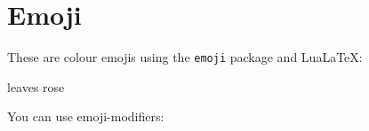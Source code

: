 \documentclass[12pt]{article}
\begin{document}
\section{Emoji }%
\label{sec:Emoji}

These are colour emojis using the \texttt{emoji} package and LuaLaTeX:

leaves
rose

You can use emoji-modifiers:
\end{document}
